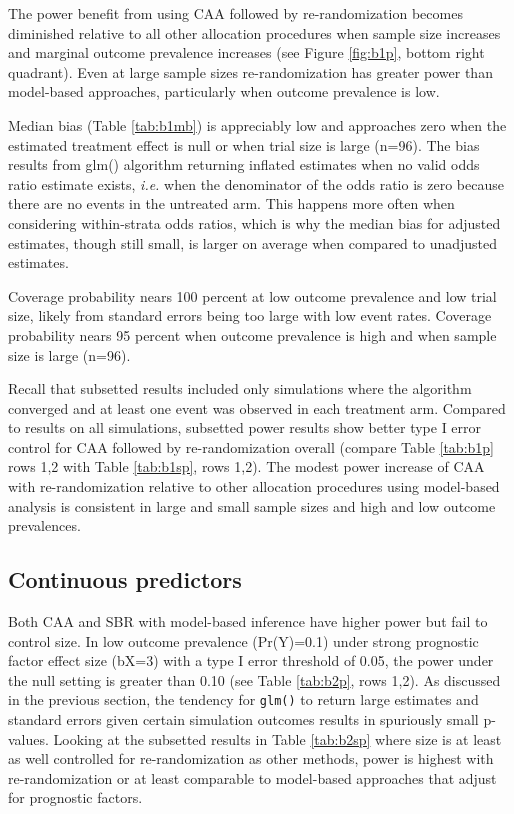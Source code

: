 The power benefit from using CAA followed by re-randomization becomes diminished relative to all other allocation procedures when sample size increases and marginal outcome prevalence increases (see Figure \ref{fig:b1p}, bottom right quadrant).
Even at large sample sizes re-randomization has greater power than model-based approaches, particularly when outcome prevalence is low.

Median bias (Table \ref{tab:b1mb}) is appreciably low and approaches zero when the estimated treatment effect is null or when trial size is large (n=96).
The bias results from glm() algorithm returning inflated estimates when no valid odds ratio estimate exists, \textit{i.e.} when the denominator of the odds ratio is zero because there are no events in the untreated arm.
This happens more often when considering within-strata odds ratios, which is why the median bias for adjusted estimates, though still small, is larger on average when compared to unadjusted estimates.

Coverage probability nears 100 percent at low outcome prevalence and low trial size, likely from standard errors being too large with low event rates.
Coverage probability nears 95 percent when outcome prevalence is high and when sample size is large (n=96).

Recall that subsetted results included only simulations where the algorithm converged and at least one event was observed in each treatment arm.
Compared to results on all simulations, subsetted power results show better type I error control for CAA followed by re-randomization overall (compare Table \ref{tab:b1p} rows 1,2 with Table \ref{tab:b1sp}, rows 1,2).
The modest power increase of CAA with re-randomization relative to other allocation procedures using model-based analysis is consistent in large and small sample sizes and high and low outcome prevalences.


\subsection{Continuous predictors}
Both CAA and SBR with model-based inference have higher power but fail to control size.
In low outcome prevalence (Pr(Y)=0.1) under strong prognostic factor effect size (bX=3) with a type I error threshold of 0.05, the power under the null setting is greater than 0.10 (see Table \ref{tab:b2p}, rows 1,2). 
As discussed in the previous section, the tendency for \texttt{glm()} to return large estimates and standard errors given certain simulation outcomes results in spuriously small p-values. 
Looking at the subsetted results in Table \ref{tab:b2sp} where size is at least as well controlled for re-randomization as other methods, power is highest with re-randomization or at least comparable to model-based approaches that adjust for prognostic factors.

